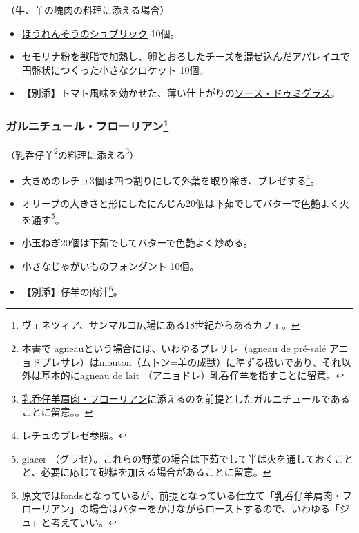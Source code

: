 \begin{recette}
（牛、羊の塊肉の料理に添える場合）

\begin{itemize}
\item
  \protect\hyperlink{sucric-d-epinards}{ほうれんそうのシュブリック}
  10個。
\item
  セモリナ粉を獣脂で加熱し、卵とおろしたチーズを混ぜ込んだアパレイユで円盤状につくった小さな\protect\hyperlink{croquettes}{クロケット}
  10個。
\item
  【別添】トマト風味を効かせた、薄い仕上がりの\protect\hyperlink{sauce-demi-glace}{ソース・ドゥミグラス}。
\end{itemize}

\atoaki{}

\hypertarget{garniture-Florian}{%
\subsubsection[ガルニチュール・フローリアン]{\texorpdfstring{ガルニチュール・フローリアン\footnote{ヴェネツィア、サンマルコ広場にある18世紀からあるカフェ。}}{ガルニチュール・フローリアン}}\label{garniture-Florian}}



（乳呑仔羊\footnote{本書で
  agneauという場合には、いわゆるプレサレ（agneau de pré-salé
  アニョドプレサレ）はmouton（ムトン=羊の成獣）に準ずる扱いであり、それ以外は基本的にagneau
  de lait （アニョドレ）乳呑仔羊を指すことに留意。}の料理に添える\footnote{\protect\hyperlink{epaule-d-agneau-florian}{乳呑仔羊肩肉・フローリアン}に添えるのを前提としたガルニチュールであることに留意。。}）

\begin{itemize}
\item
  大きめのレチュ3個は四つ割りにして外葉を取り除き、ブレゼする\footnote{\protect\hyperlink{laitue-braisee}{レチュのブレゼ}参照。}。
\item
  オリーブの大きさと形にしたにんじん20個は下茹でしてバターで色艶よく火を通す\footnote{glacer
    （グラセ）。これらの野菜の場合は下茹でして半ば火を通しておくことと、必要に応じて砂糖を加える場合があることに留意。}。
\item
  小玉ねぎ20個は下茹でしてバターで色艶よく炒める。
\item
  小さな\protect\hyperlink{pommes-de-terre-fondantes}{じゃがいものフォンダント}
  10個。
\item
  【別添】仔羊の肉汁\footnote{原文ではfondsとなっているが、前提となっている仕立て「乳呑仔羊肩肉・フローリアン」の場合はバターをかけながらローストするので、いわゆる「ジュ」と考えていい。}。
\end{itemize}


\end{recette}
